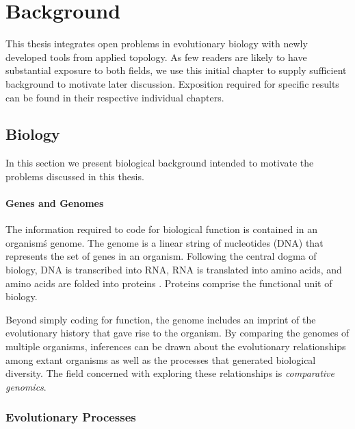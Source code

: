 \chapter{Background}
\label{ch:background}

This thesis integrates open problems in evolutionary biology with newly developed tools from applied topology.
As few readers are likely to have substantial exposure to both fields, we use this initial chapter to supply sufficient background to motivate later discussion.
Exposition required for specific results can be found in their respective individual chapters.

\section{Biology}

In this section we present biological background intended to motivate the problems discussed in this thesis.

\subsubsection{Genes and Genomes}

The information required to code for biological function is contained in an organism\'s genome.
The genome is a linear string of nucleotides (DNA) that represents the set of genes in an organism.
Following the central dogma of biology, DNA is transcribed into RNA, RNA is translated into amino acids, and amino acids are folded into proteins \cite{Crick:1970wb}.
Proteins comprise the functional unit of biology.

Beyond simply coding for function, the genome includes an imprint of the evolutionary history that gave rise to the organism.
By comparing the genomes of multiple organisms, inferences can be drawn about the evolutionary relationships among extant organisms as well as the processes that generated biological diversity.
The field concerned with exploring these relationships is \emph{comparative genomics}.

\subsection{Evolutionary Processes}

